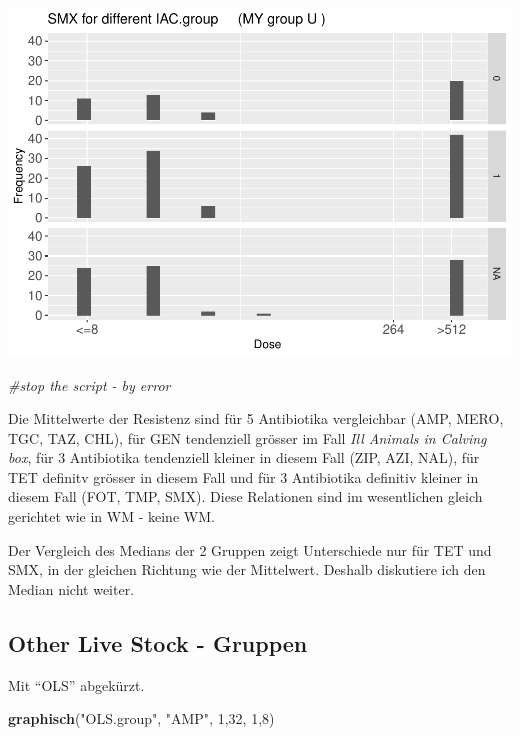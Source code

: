 \documentclass[
]{article}
\newenvironment{Shaded}{\begin{snugshade}}{\end{snugshade}}
\newcommand{\CommentTok}[1]{\textcolor[rgb]{0.56,0.35,0.01}{\textit{#1}}}
\newcommand{\DecValTok}[1]{\textcolor[rgb]{0.00,0.00,0.81}{#1}}
\newcommand{\KeywordTok}[1]{\textcolor[rgb]{0.13,0.29,0.53}{\textbf{#1}}}
\newcommand{\NormalTok}[1]{#1}
\newcommand{\StringTok}[1]{\textcolor[rgb]{0.31,0.60,0.02}{#1}}
\begin{document}
\includegraphics{Verteilungen_files/figure-latex/unnamed-chunk-17-1.pdf}

\begin{Shaded}
\begin{Highlighting}[]
   \CommentTok{#stop the script - by error }
\end{Highlighting}
\end{Shaded}

Die Mittelwerte der Resistenz sind für 5 Antibiotika vergleichbar (AMP,
MERO, TGC, TAZ, CHL), für GEN tendenziell grösser im Fall \emph{Ill
Animals in Calving box}, für 3 Antibiotika tendenziell kleiner in diesem
Fall (ZIP, AZI, NAL), für TET definitv grösser in diesem Fall und für 3
Antibiotika definitiv kleiner in diesem Fall (FOT, TMP, SMX). Diese
Relationen sind im wesentlichen gleich gerichtet wie in WM - keine WM.

Der Vergleich des Medians der 2 Gruppen zeigt Unterschiede nur für TET
und SMX, in der gleichen Richtung wie der Mittelwert. Deshalb diskutiere
ich den Median nicht weiter.

\hypertarget{other-live-stock---gruppen}{%
\subsection{Other Live Stock -
Gruppen}\label{other-live-stock---gruppen}}

Mit ``OLS'' abgekürzt.

\begin{Shaded}
\begin{Highlighting}[]
  \KeywordTok{graphisch}\NormalTok{(}\StringTok{"OLS.group"}\NormalTok{, }\StringTok{"AMP"}\NormalTok{, }\DecValTok{1}\NormalTok{,}\DecValTok{32}\NormalTok{, }\DecValTok{1}\NormalTok{,}\DecValTok{8}\NormalTok{)}
\end{Highlighting}
\end{Shaded}
\end{document}
